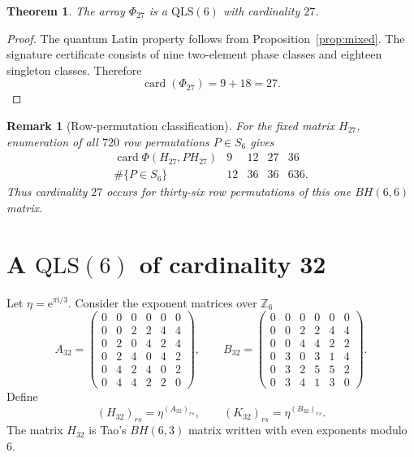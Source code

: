\documentclass[11pt,a4paper]{article}
\newcommand{\Z}{\mathbb{Z}}
\newcommand{\QLS}{\mathrm{QLS}}
\newcommand{\card}{\operatorname{card}}
\newcommand{\ii}{\mathrm{i}}
\newcommand{\e}{\mathrm{e}}
\newtheorem{theorem}{Theorem}
\newtheorem{remark}{Remark}
\begin{document}
\begin{theorem}\label{thm:c27}
The array $\Phi_{27}$ is a $\QLS(6)$ with cardinality $27$.
\end{theorem}

\begin{proof}
The quantum Latin property follows from Proposition~\ref{prop:mixed}.  The
signature certificate consists of nine two-element phase classes and eighteen
singleton classes.  Therefore
\[
 \card(\Phi_{27})=9+18=27.
\]
\end{proof}

\begin{remark}[Row-permutation classification]
For the fixed matrix $H_{27}$, enumeration of all $720$ row permutations
$P\in S_6$ gives
\[
 \begin{array}{c|rrrr}
 \card\Phi(H_{27},PH_{27})&9&12&27&36\\ \hline
 \#\{P\in S_6\}&12&36&36&636.
 \end{array}
\]
Thus cardinality $27$ occurs for thirty-six row permutations of this one
$BH(6,6)$ matrix.
\end{remark}


\section{A \texorpdfstring{$\QLS(6)$}{QLS(6)} of cardinality 32}\label{sec:c32}

Let $\eta=\e^{\pi\ii/3}$.  Consider the exponent matrices over $\Z_6$
\begin{equation}\label{eq:A32B32}
 A_{32}=
 \begin{pmatrix}
 0&0&0&0&0&0\\
 0&0&2&2&4&4\\
 0&2&0&4&2&4\\
 0&2&4&0&4&2\\
 0&4&2&4&0&2\\
 0&4&4&2&2&0
 \end{pmatrix},
 \qquad
 B_{32}=
 \begin{pmatrix}
 0&0&0&0&0&0\\
 0&0&2&2&4&4\\
 0&0&4&4&2&2\\
 0&3&0&3&1&4\\
 0&3&2&5&5&2\\
 0&3&4&1&3&0
 \end{pmatrix}.
\end{equation}
Define
\[
 (H_{32})_{rs}=\eta^{(A_{32})_{rs}},
 \qquad
 (K_{32})_{rs}=\eta^{(B_{32})_{rs}}.
\]
The matrix $H_{32}$ is Tao's $BH(6,3)$ matrix written with even exponents
modulo $6$.
\end{document}
